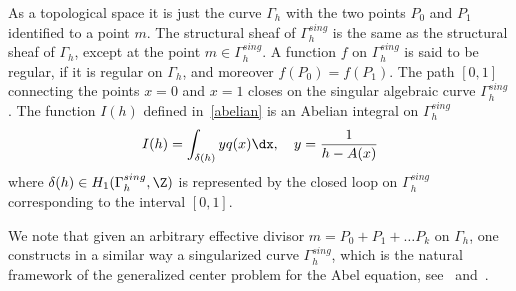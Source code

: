 As a topological space it is just the curve $\Gamma_h$ with the two points $P_0$ and $P_1$ identified to a point $m$. The structural sheaf of $\Gamma_h^{sing}$ is the same as the structural sheaf of $\Gamma_h$, except at the point $m\in \Gamma_h^{sing}$. A function $f$ on $ \Gamma_h^{sing}$ is said to be regular, if it is regular on $\Gamma_h$, and moreover $f(P_0)=f(P_1)$. The path $[0,1]$ connecting the points $x=0$ and $x=1$ closes on the singular algebraic curve $\Gamma_h^{sing}$. The function $I(h)$ defined in~\eqref{abelian} is an Abelian integral on $\Gamma_h^{sing}$
\[
I(h) = \int_{\delta(h)} y q(x) \dx, \quad y = \frac{1}{h-A(x)}
\]
where $\delta(h) \in H_1(\Gamma_h^{sing},\Z)$ is represented by the closed loop on $\Gamma_h^{sing}$ corresponding to the interval $[0,1]$.

We note that given an arbitrary effective divisor $m=P_0+P_1+ \dots P_k$ on $\Gamma_h$, one constructs in a similar way a singularized curve $\Gamma_h^{sing}$, which is the natural framework of the generalized center problem for the Abel equation, see~\cite[Conjecture~1.7]{bfy99} and~\cite{bry10}.




